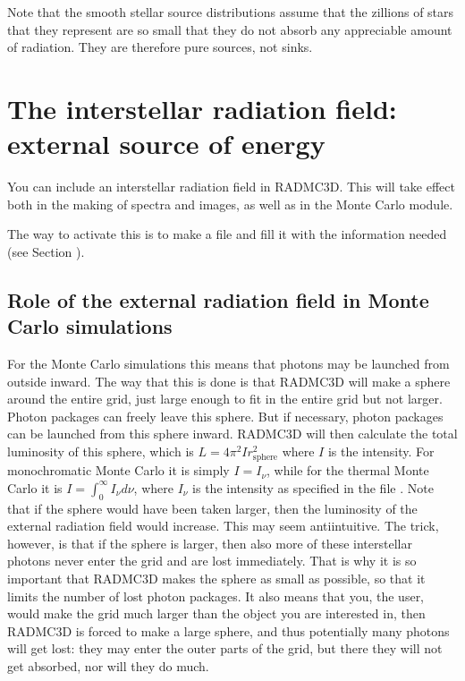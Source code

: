 \documentclass[letterpaper,10pt,english]{sphinxmanual}
\begin{document}
Note that the smooth stellar source distributions assume that the zillions
of stars that they represent are so small that they do not absorb any
appreciable amount of radiation. They are therefore pure sources, not sinks.


\section{The interstellar radiation field: external source of energy}
\label{\detokenize{stars:the-interstellar-radiation-field-external-source-of-energy}}\label{\detokenize{stars:sec-external-source}}
You can include an  interstellar radiation field in
RADMC\sphinxhyphen{}3D. This will take effect both in the making of spectra and images, as
well as in the Monte Carlo module.

The way to activate this is to make a file 
and fill it with the information needed (see Section {\hyperref[\detokenize{inputoutputfiles:sec-ext-src-inp}]{}}).


\subsection{Role of the external radiation field in Monte Carlo simulations}
\label{\detokenize{stars:role-of-the-external-radiation-field-in-monte-carlo-simulations}}
For the Monte Carlo simulations this means that photons may be launched from
outside inward. The way that this is done is that RADMC\sphinxhyphen{}3D will make a
sphere around the entire grid, just large enough to fit in the entire grid
but not larger. Photon packages can freely leave this sphere. But if
necessary, photon packages can be launched from this sphere inward.
RADMC\sphinxhyphen{}3D will then calculate the total luminosity of this sphere, which is
\(L=4\pi^2 I r_{\mathrm{sphere}}^2\) where \(I\) is the intensity. For
monochromatic Monte Carlo it is simply \(I=I_\nu\), while for the thermal
Monte Carlo it is \(I=\int_0^\infty I_\nu d\nu\), where \(I_\nu\) is the
intensity as specified in the file .  Note
that if the sphere would have been taken larger, then the luminosity of the
external radiation field would increase. This may seem anti\sphinxhyphen{}intuitive. The
trick, however, is that if the sphere is larger, then also more of these
interstellar photons never enter the grid and are lost immediately. That is
why it is so important that RADMC\sphinxhyphen{}3D makes the sphere as small as possible,
so that it limits the number of lost photon packages. It also means that you,
the user, would make the grid much larger than the object you are interested
in, then RADMC\sphinxhyphen{}3D is forced to make a large sphere, and thus potentially
many photons will get lost: they may enter the outer parts of the grid, but
there they will not get absorbed, nor will they do much.
\end{document}
